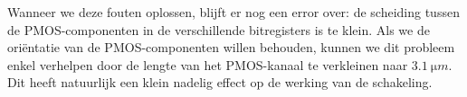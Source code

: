 \documentclass[11pt,a4paper,oneside,dutch]{article}
\begin{document}
Wanneer we deze fouten oplossen, blijft er nog een error over: de scheiding tussen de PMOS-componenten in de verschillende bitregisters is te klein. Als we de oriëntatie van de PMOS-componenten willen behouden, kunnen we dit probleem enkel verhelpen door de lengte van het PMOS-kanaal te verkleinen naar $\SI{3,1}{\micro m}$. Dit heeft natuurlijk een klein nadelig effect op de werking van de schakeling.
\end{document}
